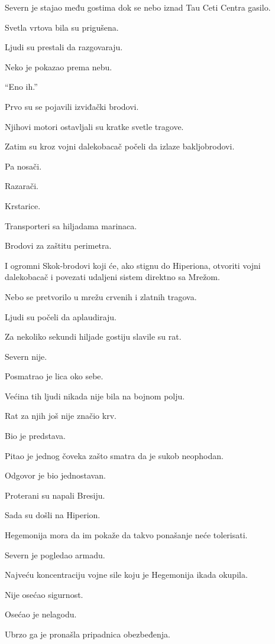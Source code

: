\bigskip

Severn je stajao među gostima dok se nebo iznad Tau Ceti Centra gasilo.

Svetla vrtova bila su prigušena.

Ljudi su prestali da razgovaraju.

Neko je pokazao prema nebu.

``Eno ih.''

Prvo su se pojavili izviđački brodovi.

Njihovi motori ostavljali su kratke svetle tragove.

Zatim su kroz vojni dalekobacač počeli da izlaze bakljobrodovi.

Pa nosači.

Razarači.

Krstarice.

Transporteri sa hiljadama marinaca.

Brodovi za zaštitu perimetra.

I ogromni Skok-brodovi koji će, ako stignu do Hiperiona, otvoriti vojni dalekobacač i povezati udaljeni sistem direktno sa Mrežom.

Nebo se pretvorilo u mrežu crvenih i zlatnih tragova.

Ljudi su počeli da aplaudiraju.

Za nekoliko sekundi hiljade gostiju slavile su rat.

Severn nije.

Posmatrao je lica oko sebe.

Većina tih ljudi nikada nije bila na bojnom polju.

Rat za njih još nije značio krv.

Bio je predstava.

Pitao je jednog čoveka zašto smatra da je sukob neophodan.

Odgovor je bio jednostavan.

Proterani su napali Bresiju.

Sada su došli na Hiperion.

Hegemonija mora da im pokaže da takvo ponašanje neće tolerisati.

Severn je pogledao armadu.

Najveću koncentraciju vojne sile koju je Hegemonija ikada okupila.

Nije osećao sigurnost.

Osećao je nelagodu.

\bigskip

Ubrzo ga je pronašla pripadnica obezbeđenja.

